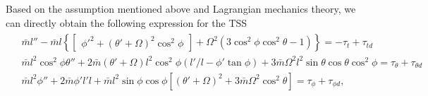 \documentclass[3p]{elsarticle}
\theoremstyle{plain}
\theoremstyle{remark}
\begin{document}
Based on the assumption mentioned above and Lagrangian mechanics theory, we can directly obtain the following expression for the TSS~\cite{Sun2014304,Mantellato2015}
\begin{align}
\begin{split}
&\bar m l''-\bar m l\left\{\begin{bmatrix}\phi'^2+(\theta'+\Omega)^2\cos^2\phi\end{bmatrix}+\Omega^2(3\cos^2\phi\cos^2\theta-1)\right\}=-\tau_t+\tau_{td}\\
&\bar m l^2\cos^2\phi\theta''+2\bar m (\theta'+\Omega)l^2\cos^2\phi(l'/l-\phi'\tan\phi)+3\bar m \Omega^2l^2\sin\theta\cos\theta\cos^2\phi=\tau_\theta+\tau_{\theta d}\\
&\bar m l^2\phi''+2\bar m \phi'l'l+\bar m l^2\sin\phi\cos\phi\left[(\theta'+\Omega)^2+3\bar m \Omega^2\cos^2\theta\right]=\tau_\phi+\tau_{\phi d},\label{eq:dynamics 1}
\end{split}
\end{align}
\end{document}
